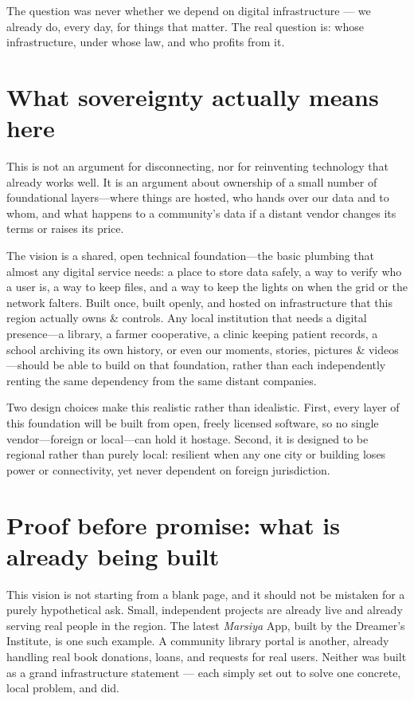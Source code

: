 \documentclass[12pt]{article}
\begin{document}
\begin{vision}
The question was never whether we depend on digital infrastructure --- we already
do, every day, for things that matter. The real question is: whose infrastructure,
under whose law, and who profits from it.
\end{vision}

\section{What sovereignty actually means here}

This is not an argument for disconnecting, nor for reinventing technology that already works well. It is an argument about ownership of a small number of foundational layers—where things are hosted, who hands over our data and to whom, and what happens to a community's data if a distant vendor changes its terms or raises its price.

The vision is a shared, open technical foundation—the basic plumbing that almost any digital service needs: a place to store data safely, a way to verify who a user is, a way to keep files, and a way to keep the lights on when the grid or the network falters. Built once, built openly, and hosted on infrastructure that this region actually owns \& controls. Any local institution that needs a digital presence—a library, a farmer cooperative, a clinic keeping patient records, a school archiving its own history, or even our moments, stories, pictures \& videos—should be able to build on that foundation, rather than each independently renting the same dependency from the same distant companies.

Two design choices make this realistic rather than idealistic. First, every layer of this foundation will be built from open, freely licensed software, so no single vendor—foreign or local—can hold it hostage. Second, it is designed to be regional rather than purely local: resilient when any one city or building loses power or connectivity, yet never dependent on foreign jurisdiction.



\section{Proof before promise: what is already being built}

This vision is not starting from a blank page, and it should not be mistaken for
a purely hypothetical ask. Small, independent projects are already live and
already serving real people in the region. The latest \emph{Marsiya} App, built by the
Dreamer's Institute, is one such example. A community library portal is another,
already handling real book donations, loans, and requests for real users. Neither
was built as a grand infrastructure statement --- each simply set out to solve one
concrete, local problem, and did.
\end{document}
